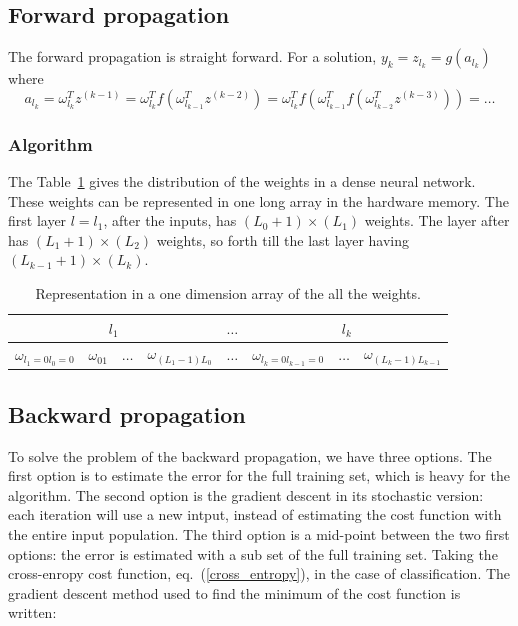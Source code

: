 \documentclass[final, paper=letter,5p,times,twocolumn]{elsarticle}
\begin{document}
\subsection{Forward propagation}

The forward propagation is straight forward. For a solution, $y_{k} = z_{l_{k}} = g(a_{l_{k}})$ where
$$
a_{l_{k}} = \omega_{l_{k}}^{T} z^{(k-1)} = \omega_{l_{k}}^{T} f(\omega_{l_{k-1}}^{T} z^{(k-2)}) = \omega_{l_{k}}^{T} f(\omega_{l_{k-1}}^{T} f(\omega_{l_{k-2}}^{T} z^{(k-3)})) = \dots
$$

\subsubsection{Algorithm}

The Table~\ref{weights_in_mem} gives the distribution of the weights in a dense neural network. These weights can be represented in one long array in the hardware memory. The first layer $l = l_{1}$, after the inputs, has $(L_{0}+1)\times(L_{1})$ weights. The layer after has $(L_{1}+1)\times(L_{2})$ weights, so forth till the last layer having $(L_{k-1}+1)\times(L_{k})$.


\begin{table}[]
\centering
\caption{Representation in a one dimension array of the all the weights.}
\label{weights_in_mem}
\begin{tabular}{|c|c|c|c|c|c|c|c|}
\hline
\multicolumn{4}{|c|}{$l_{1}$} & $\hdots$ & \multicolumn{3}{c|}{$l_{k}$} \\ \hline
$\omega_{l_{1}=0l_{0}=0}$   &   $\omega_{01}$   & $\hdots$  &  $\omega_{(L_{1}-1)L_{0}}$   & $\hdots$ &    $\omega_{l_{k}=0l_{k-1}=0}$    & $\hdots$  &   $\omega_{(L_{k}-1)L_{k-1}}$ \\ \hline
\end{tabular}
\end{table}

\subsection{Backward propagation}

To solve the problem of the backward propagation, we have three options. The first option is to estimate the error for the full training set, which is heavy for the algorithm. The second option is the gradient descent in its stochastic version: each iteration will use a new intput, instead of estimating the cost function with the entire input population. The third option is a mid-point between the two first options: the error is estimated with a sub set of the full training set.
Taking the cross-enropy cost function, eq.~(\ref{cross_entropy}), in the case of classification. The gradient descent method used to find the minimum of the cost function is written:
\end{document}
